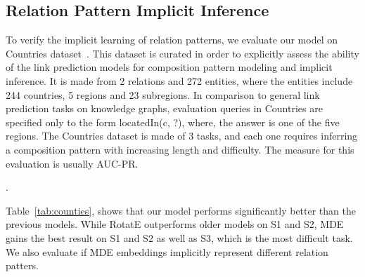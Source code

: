 \documentclass{ecai}
\begin{document}
\subsection{Relation Pattern Implicit Inference}
To verify the implicit learning of relation patterns, we evaluate our model on Countries dataset~\cite{bouchard2015approximate,nickel2016holographic}. This dataset is curated in order to explicitly assess the ability of the link prediction models for composition pattern modeling and implicit inference. It is made from 2 relations and 272 entities, where the entities include 244 countries, 5 regions and 23 subregions. In comparison to general link prediction tasks on knowledge graphs, evaluation queries in Countries are specified only to the form locatedIn(c, ?), where, the answer is one of the five regions. The Countries dataset is made of 3 tasks, and each one requires inferring a composition pattern with increasing length and difficulty. The measure for this evaluation is usually AUC-PR.


\begin{table}\centering
{}
    \caption{Results on the Countries datasets. Results of RotatE are taken from~\cite{sun2019rotate} and the results of the other models are from~\cite{dettmers2018convolutional}.}.
\label{tab:counties}
\end{table}

Table~\ref{tab:counties}, shows that our model performs significantly better than the previous models. While RotatE outperforms older models on S1 and S2, MDE gains the best result on S1 and S2 as well as S3, which is the most difficult task.
We also evaluate if MDE embeddings implicitly represent different relation patters.
\end{document}

